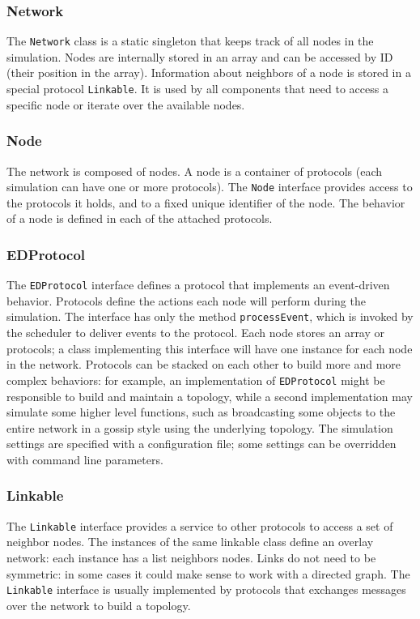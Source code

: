 \subsubsection{Network}
The \texttt{Network} class is a static singleton that keeps track of all nodes in the simulation.
Nodes are internally stored in an array and can be accessed by ID (their position in the array).
Information about neighbors of a node is stored in a special protocol \texttt{Linkable}.
It is used by all components that need to access a specific node or iterate over the available nodes.

\subsubsection{Node}
The network is composed of nodes.
A node is a container of protocols (each simulation can have one or more protocols).
The \texttt{Node} interface provides access to the protocols it holds, and to a fixed unique identifier of the node.
The behavior of a node is defined in each of the attached protocols.

\subsubsection{EDProtocol}
The \texttt{EDProtocol} interface defines a protocol that implements an event-driven behavior.
Protocols define the actions each node will perform during the simulation.
The interface has only the method \texttt{processEvent}, which is invoked by the scheduler to deliver events to the protocol.
Each node stores an array or protocols;
a class implementing this interface will have one instance for each node in the network.
Protocols can be stacked on each other to build more and more complex behaviors:
for example, an implementation of \texttt{EDProtocol} might be responsible to build and maintain a topology, while a second implementation may simulate some higher level functions, such as broadcasting some objects to the entire network in a gossip style using the underlying topology.
The simulation settings are specified with a configuration file;
some settings can be overridden with command line parameters.

\subsubsection{Linkable}
The \texttt{Linkable} interface provides a service to other protocols to access a set of neighbor nodes.
The instances of the same linkable class define an overlay network:
each instance has a list neighbors nodes.
Links do not need to be symmetric:
in some cases it could make sense to work with a directed graph.
The \texttt{Linkable} interface is usually implemented by protocols that exchanges messages over the network to build a topology.

